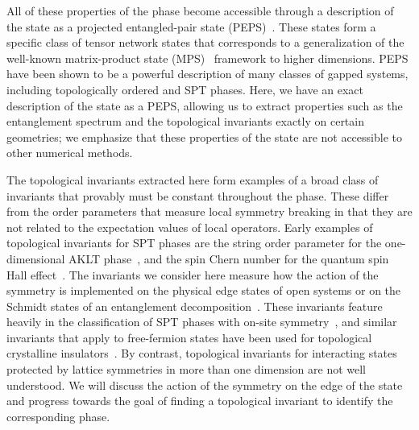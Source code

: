 All of these properties of the phase become accessible through a description of the state
as a projected entangled-pair state (PEPS)~\cite{verstraete2004}. These states form a specific class of tensor
network states that corresponds to a generalization of the well-known matrix-product state
(MPS)~\cite{white1992,ostlund1996,schollwoeck2010}
framework to higher dimensions. PEPS have been shown to be a powerful description of many
classes of gapped systems, including topologically ordered and SPT phases. Here, we have an
exact description of the state as a PEPS, allowing us to extract properties such as the entanglement
spectrum and the topological invariants exactly on certain geometries; we emphasize that these
properties of the state are not accessible to other numerical methods.

The topological invariants extracted here form examples of a broad class
of invariants that provably must be constant throughout the phase. These differ
from the order parameters that measure local symmetry breaking in that they
are not related to the expectation values of local operators. Early examples
of topological invariants for SPT phases are the string order parameter for the one-dimensional
AKLT phase~\cite{...}, and the spin Chern number for the quantum spin Hall effect~\cite{...}.
The invariants we consider here measure how the action of the symmetry is implemented on the 
physical edge states of open systems or on the Schmidt states of an 
entanglement decomposition~\cite{pollmann,...}. These invariants feature heavily in the 
classification of SPT phases with on-site symmetry~\cite{...}, and similar invariants 
that apply to free-fermion states have been used for topological crystalline 
insulators~\cite{bernevig...}. By contrast, topological invariants for interacting states 
protected by lattice symmetries in more than one dimension are not well 
understood. We will discuss the action of the symmetry on the edge of the  
state and progress towards the goal of finding a topological invariant to 
identify the corresponding phase.
